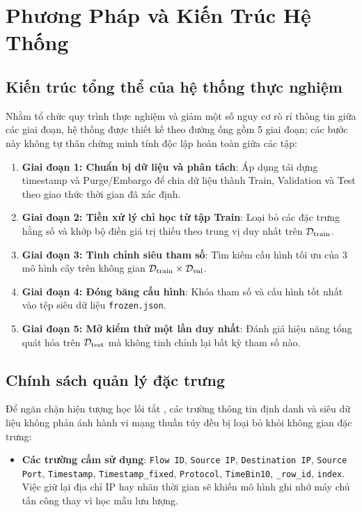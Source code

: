 
\chapter{Phương Pháp và Kiến Trúc Hệ Thống}
\label{chap:phuong_phap}

\section{Kiến trúc tổng thể của hệ thống thực nghiệm}

Nhằm tổ chức quy trình thực nghiệm và giảm một số nguy cơ rò rỉ thông tin giữa các giai đoạn, hệ thống được thiết kế theo đường ống gồm 5 giai đoạn; các bước này không tự thân chứng minh tính độc lập hoàn toàn giữa các tập:
\begin{enumerate}
    \item \textbf{Giai đoạn 1: Chuẩn bị dữ liệu và phân tách}: Áp dụng tái dựng timestamp và Purge/Embargo để chia dữ liệu thành Train, Validation và Test theo giao thức thời gian đã xác định.
    \item \textbf{Giai đoạn 2: Tiền xử lý chỉ học từ tập Train}: Loại bỏ các đặc trưng hằng số và khớp bộ điền giá trị thiếu theo trung vị duy nhất trên $\mathcal{D}_{\text{train}}$.
    \item \textbf{Giai đoạn 3: Tinh chỉnh siêu tham số}: Tìm kiếm cấu hình tối ưu của 3 mô hình cây trên không gian $\mathcal{D}_{\text{train}} \times \mathcal{D}_{\text{val}}$.
    \item \textbf{Giai đoạn 4: Đóng băng cấu hình}: Khóa tham số và cấu hình tốt nhất vào tệp siêu dữ liệu \texttt{frozen.json}.
    \item \textbf{Giai đoạn 5: Mở kiểm thử một lần duy nhất}: Đánh giá hiệu năng tổng quát hóa trên $\mathcal{D}_{\text{test}}$ mà không tinh chỉnh lại bất kỳ tham số nào.
\end{enumerate}

\section{Chính sách quản lý đặc trưng}

Để ngăn chặn hiện tượng học lối tắt \cite{geirhos2020shortcut}, các trường thông tin định danh và siêu dữ liệu không phản ánh hành vi mạng thuần túy đều bị loại bỏ khỏi không gian đặc trưng:
\begin{itemize}
    \item \textbf{Các trường cấm sử dụng}: \texttt{Flow ID}, \texttt{Source IP}, \texttt{Destination IP}, \texttt{Source Port}, \texttt{Timestamp}, \texttt{Timestamp\_fixed}, \texttt{Protocol}, \texttt{TimeBin10}, \texttt{\_row\_id}, \texttt{index}. Việc giữ lại địa chỉ IP hay nhãn thời gian sẽ khiến mô hình ghi nhớ máy chủ tấn công thay vì học mẫu lưu lượng.
\end{itemize}


